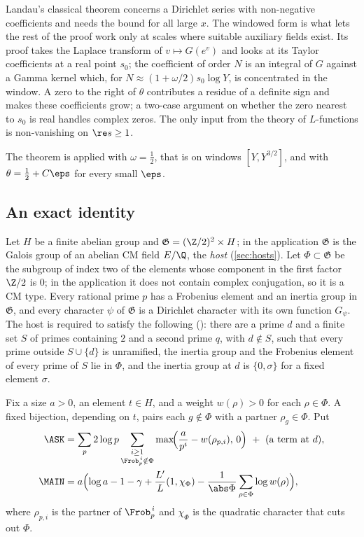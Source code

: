 Landau's classical theorem \cite{landau1905} concerns a Dirichlet series with non-negative
coefficients and needs the bound for all large $x$. The windowed form is what lets the rest of
the proof work only at scales where suitable auxiliary fields exist. Its proof
takes the Laplace transform of $v\mapsto G(e^v)$ and looks at its Taylor coefficients at a real
point $s_0$; the coefficient of order $N$ is an integral of $G$ against a Gamma
kernel which, for $N\approx(1+\omega/2)s_0\log Y$, is concentrated in the window. A zero to
the right of $\theta$ contributes a residue of a definite sign and makes these coefficients
grow; a two-case argument on whether the zero nearest to $s_0$ is real handles complex
zeros. The only input from the theory of $L$-functions is non-vanishing on $\re s\ge1$.

The theorem is applied with $\omega=\tfrac12$, that is on windows $[Y,Y^{3/2}]$, and with
$\theta=\tfrac12+C\eps$ for every small $\eps$.

\subsection{An exact identity}\label{sec:identity}
Let $H$ be a finite abelian group and $\mathfrak G=(\Z/2)^2\times H$; in the application
$\mathfrak G$ is the Galois group of an abelian CM field $E/\Q$, the \emph{host}
(\cref{sec:hosts}). Let $\Phi\subset\mathfrak G$ be the subgroup of index two of the elements
whose component in the first factor $\Z/2$ is $0$; in the application it does not contain
complex conjugation, so it is a CM type. Every rational prime $p$ has a Frobenius element and an inertia group in
$\mathfrak G$, and every character $\psi$ of $\mathfrak G$ is a Dirichlet character with its own
function $G_\psi$. The host is required to satisfy the following \lvS{}
(): there are a prime $d$ and a finite set $S$ of primes containing $2$ and a
second prime $q$, with $d\notin S$, such that every prime outside $S\cup\{d\}$ is unramified,
the inertia group and the Frobenius element of every prime of $S$ lie in $\Phi$, and the inertia
group at $d$ is $\{0,\sigma\}$ for a fixed element $\sigma$.

Fix a size $a>0$, an element $t\in H$, and a weight $w(\rho)>0$ for each $\rho\in\Phi$. A fixed
bijection, depending on $t$, pairs each $g\notin\Phi$ with a partner $\rho_g\in\Phi$. Put
\begin{align}
\ASK &= \sum_{p}2\log p\sum_{\substack{i\ge1\\ \Frob_p^{\,i}\notin\Phi}}
        \max\!\Bigl(\frac{a}{p^{i}}-w(\rho_{p,i}),\,0\Bigr)\ +\ (\text{a term at } d),
        \label{eq:ask}\\
\MAIN &= a\Bigl(\log a-1-\gamma+\frac{L'}{L}(1,\chi_\Phi)
        -\frac1{\abs\Phi}\sum_{\rho\in\Phi}\log w(\rho)\Bigr),\label{eq:main}
\end{align}
where $\rho_{p,i}$ is the partner of $\Frob_p^{\,i}$ and $\chi_\Phi$ is the quadratic character
that cuts out $\Phi$.

